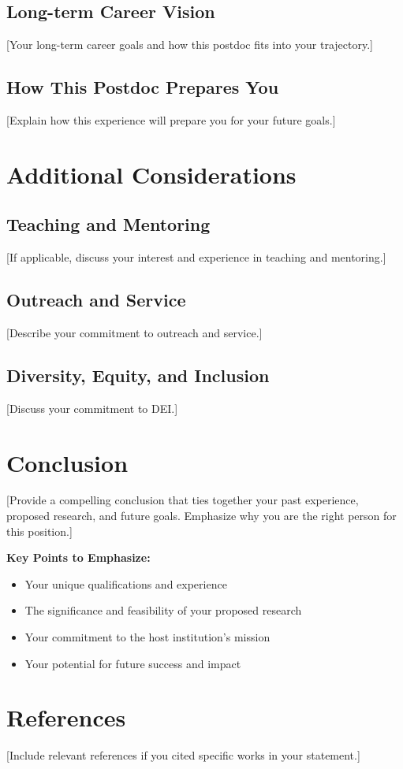 \documentclass[11pt,a4paper]{article}
\begin{document}
\subsection{Long-term Career Vision}
[Your long-term career goals and how this postdoc fits into your trajectory.]

\subsection{How This Postdoc Prepares You}
[Explain how this experience will prepare you for your future goals.]

\section{Additional Considerations}
\subsection{Teaching and Mentoring}
[If applicable, discuss your interest and experience in teaching and mentoring.]

\subsection{Outreach and Service}
[Describe your commitment to outreach and service.]

\subsection{Diversity, Equity, and Inclusion}
[Discuss your commitment to DEI.]

\section{Conclusion}
[Provide a compelling conclusion that ties together your past experience, proposed research, and future goals. Emphasize why you are the right person for this position.]

\textbf{Key Points to Emphasize:}
\begin{itemize}
    \item Your unique qualifications and experience
    \item The significance and feasibility of your proposed research
    \item Your commitment to the host institution's mission
    \item Your potential for future success and impact
\end{itemize}

\section{References}
[Include relevant references if you cited specific works in your statement.]
\end{document}
